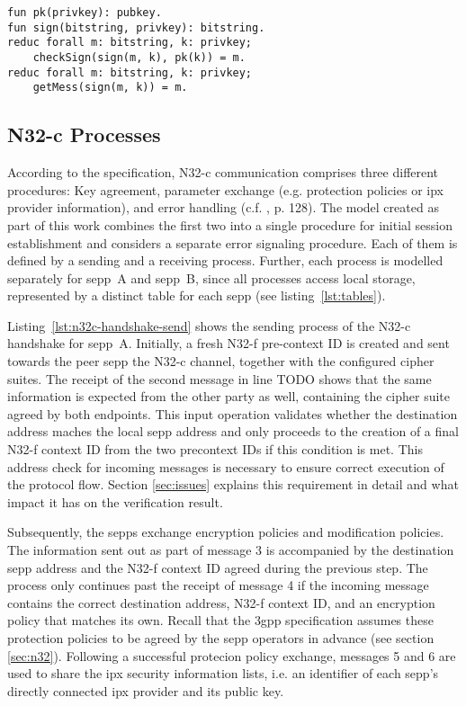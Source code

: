 \begin{lstlisting}[caption={Definition of custom constructors and destructors},label={lst:destructors},firstnumber=142]
fun pk(privkey): pubkey.
fun sign(bitstring, privkey): bitstring.
reduc forall m: bitstring, k: privkey;
    checkSign(sign(m, k), pk(k)) = m.
reduc forall m: bitstring, k: privkey;
    getMess(sign(m, k)) = m.
\end{lstlisting}

\subsection{N32-c Processes}

According to the specification, N32-c communication comprises three different procedures: Key agreement, parameter exchange (e.g. protection policies or \gls{ipx} provider information), and error handling (c.f. \cite{3gpp.33.501}, p. 128).
The model created as part of this work combines the first two into a single procedure for initial session establishment and considers a separate error signaling procedure.
Each of them is defined by a sending and a receiving process.
Further, each process is modelled separately for \gls{sepp}~A and \gls{sepp}~B, since all processes access local storage, represented by a distinct table for each \gls{sepp} (see listing~\ref{lst:tables}).

Listing~\ref{lst:n32c-handshake-send} shows the sending process of the N32-c handshake for \gls{sepp}~A.
Initially, a fresh N32-f pre-context ID is created and sent towards the peer \gls{sepp} the N32-c channel, together with the configured cipher suites.
The receipt of the second message in line TODO shows that the same information is expected from the other party as well, containing the cipher suite agreed by both endpoints.
This input operation validates whether the destination address maches the local \gls{sepp} address and only proceeds to the creation of a final N32-f context ID from the two precontext IDs if this condition is met.
This address check for incoming messages is necessary to ensure correct execution of the protocol flow.
Section \ref{sec:issues} explains this requirement in detail and what impact it has on the verification result.

Subsequently, the \glspl{sepp} exchange encryption policies and modification policies.
The information sent out as part of message 3 is accompanied by the destination \gls{sepp} address and the N32-f context ID agreed during the previous step.
The process only continues past the receipt of message 4 if the incoming message contains the correct destination address, N32-f context ID, and an encryption policy that matches its own.
Recall that the \gls{3gpp} specification assumes these protection policies to be agreed by the \gls{sepp} operators in advance (see section \ref{sec:n32}).
Following a successful protecion policy exchange, messages 5 and 6 are used to share the \gls{ipx} security information lists, i.e. an identifier of each \gls{sepp}'s directly connected \gls{ipx} provider and its public key.

